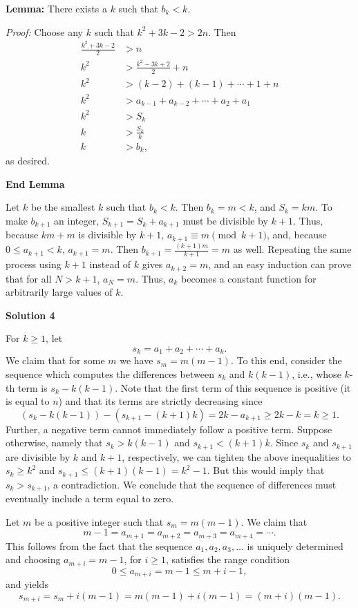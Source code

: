 \begin{enumerate}
 \textbf{Lemma:} There exists a $k$ such that $b_k < k$.

 \textit{Proof:} Choose any $k$ such that $k^2 + 3k - 2 > 2n$. Then
 \begin{align*} \frac{k^2 + 3k - 2}{2} &> n \\ k^2 &> \frac{k^2 - 3k + 2}{2} + n \\ k^2 &> (k-2) + (k-1) + \cdots + 1 + n \\ k^2 &> a_{k-1} + a_{k-2} + \cdots + a_2 + a_1 \\ k^2 &> S_k \\ k &> \frac{S_k}{k} \\ k &> b_k, \end{align*}
as desired.

 \textbf{End Lemma}

 Let $k$ be the smallest $k$ such that $b_k < k$. Then $b_k = m < k$, and $S_k = km$. To make $b_{k+1}$ an integer, $S_{k+1} = S_k + a_{k+1}$ must be divisible by $k+1$. Thus, because $km + m$ is divisible by $k+1$, $a_{k+1} \equiv m \pmod{k+1}$, and, because $0 \le a_{k+1} < k$, $a_{k+1} = m$. Then $b_{k+1} = \frac{(k+1)m}{k+1} = m$ as well. Repeating the same process using $k+1$ instead of $k$ gives $a_{k+2} = m$, and an easy induction can prove that for all $N > k+1$, $a_N = m$. Thus, $a_k$ becomes a constant function for arbitrarily large values of $k$.

 



\textbf{Solution 4}

For $k\geq 1$, let
 \[s_k = a_1 + a_2 + \cdots + a_k.\]We claim that for some $m$ we have $s_m = m(m - 1)$. To this end, consider the sequence which computes the differences between $s_k$ and $k(k - 1)$, i.e., whose $k$-th term is $s_k - k(k - 1)$. Note that the first term of this sequence is positive (it is equal to $n$) and that its terms are strictly decreasing since
 \[(s_k - k(k - 1)) - (s_{k+1} - (k + 1)k) = 2k - a_{k+1}\geq 2k - k = k\geq 1.\]Further, a negative term cannot immediately follow a positive term. Suppose otherwise, namely that $s_k > k(k - 1)$ and $s_{k+1} < (k + 1)k$. Since $s_k$ and $s_{k+1}$ are divisible by $k$ and $k + 1$, respectively, we can tighten the above inequalities to $s_k\geq k^2$ and $s_{k+1}\leq (k + 1)(k - 1) = k^2 - 1$. But this would imply that $s_k > s_{k+1}$, a contradiction. We conclude that the sequence of differences must eventually include a term equal to zero.

 Let $m$ be a positive integer such that $s_m = m(m - 1)$. We claim that
 \[m - 1 = a_{m+1} = a_{m+2} = a_{m+3} = a_{m+4} = \cdots.\]This follows from the fact that the sequence $a_1, a_2, a_3, \ldots$ is uniquely determined and choosing $a_{m+i} = m - 1$, for $i\geq 1$, satisfies the range condition
 \[0\leq a_{m+i} = m - 1\leq m + i - 1,\]and yields
 \[s_{m+i} = s_m + i(m - 1) = m(m - 1) + i(m - 1) = (m + i)(m - 1).\]





\end{enumerate}
